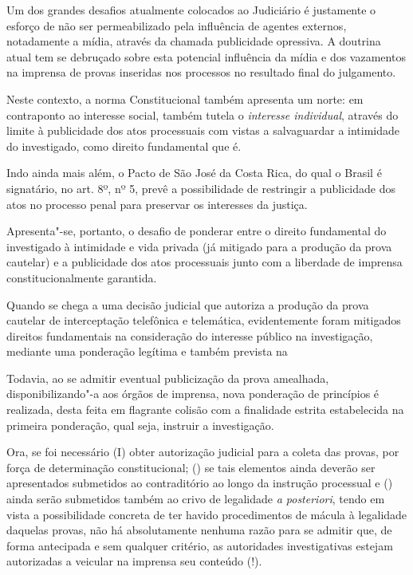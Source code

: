 Um dos grandes desafios atualmente colocados ao Judiciário é justamente
o esforço de não ser permeabilizado pela influência de agentes externos,
notadamente a mídia, através da chamada publicidade opressiva. A
doutrina atual tem se debruçado sobre esta potencial influência da mídia
e dos vazamentos na imprensa de provas inseridas nos processos no
resultado final do julgamento.

Neste contexto, a norma Constitucional também apresenta um norte: em
contraponto ao interesse social, também tutela o \emph{interesse
individual}, através do limite à publicidade dos atos processuais com
vistas a salvaguardar a intimidade do investigado, como direito
fundamental que é.

Indo ainda mais além, o Pacto de São José da Costa Rica, do qual o
Brasil é signatário, no art. 8º, nº 5, prevê a possibilidade de
restringir a publicidade dos atos no processo penal para preservar os
interesses da justiça.

Apresenta"-se, portanto, o desafio de ponderar entre o direito
fundamental do investigado à intimidade e vida privada (já mitigado para
a produção da prova cautelar) e a publicidade dos atos processuais junto
com a liberdade de imprensa constitucionalmente garantida.

Quando se chega a uma decisão judicial que autoriza a produção da prova
cautelar de interceptação telefônica e telemática, evidentemente foram
mitigados direitos fundamentais na consideração do interesse público na
investigação, mediante uma ponderação legítima e também prevista na 

Todavia, ao se admitir eventual publicização da prova amealhada,
disponibilizando"-a aos órgãos de imprensa, nova ponderação de princípios
é realizada, desta feita em flagrante colisão com a finalidade estrita
estabelecida na primeira ponderação, qual seja, instruir a investigação.

Ora, se foi necessário (I) obter autorização judicial para a coleta das
provas, por força de determinação constitucional; () se tais elementos
ainda deverão ser apresentados submetidos ao contraditório ao longo da
instrução processual e () ainda serão submetidos também ao crivo de
legalidade \emph{a posteriori}, tendo em vista a possibilidade concreta
de ter havido procedimentos de mácula à legalidade daquelas provas, não
há absolutamente nenhuma razão para se admitir que, de forma antecipada
e sem qualquer critério, as autoridades investigativas estejam
autorizadas a veicular na imprensa seu conteúdo (!).

